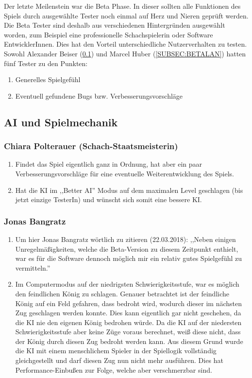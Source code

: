 \documentclass[12pt,a4paper]{article}
\begin{document}
{Der letzte Meilenstein war die Beta Phase. In dieser sollten alle Funktionen des Spiels durch ausgewählte Tester noch einmal auf Herz und Nieren geprüft werden. Die Beta Tester sind deshalb aus verschiedenen Hintergründen ausgewählt worden, zum Beispiel eine professionelle Schachspielerin oder Software EntwicklerInnen. Dies hat den Vorteil unterschiedliche Nutzerverhalten zu testen. \\[1ex]
Sowohl Alexander Beiser (\ref{SUBSEC:BETAGAME}) und Marcel Huber (\ref{SUBSEC:BETALAN}) hatten fünf Tester zu den Punkten:
\begin{enumerate}[I]
	\item{Generelles Spielgefühl}
	\item{Eventuell gefundene Bugs bzw. Verbesserungsvorschläge}
\end{enumerate}

\subsection{AI und Spielmechanik}
\label{SUBSEC:BETAGAME}


\subsubsection*{Chiara Polterauer (Schach-Staatsmeisterin)}
\begin{enumerate}[I]
	\item{Findet das Spiel eigentlich ganz in Ordnung, hat aber ein paar Verbesserungsvorschläge für eine eventuelle Weiterentwicklung des Spiels.}
	\item{Hat die KI im ,,Better AI'' Modus auf dem maximalen Level geschlagen (bis jetzt einzige TesterIn) und wünscht sich somit eine bessere KI. }
\end{enumerate}

\subsubsection*{Jonas Bangratz}
\begin{enumerate}[I]
	\item{Um hier Jonas Bangratz wörtlich zu zitieren (22.03.2018): ,,Neben einigen Unregelmäßigkeiten, welche die Beta-Version zu diesem Zeitpunkt enthielt, war es für die Software dennoch möglich mir ein relativ gutes Spielgefühl zu vermitteln.''}
	\item{Im Computermodus auf der niedrigsten Schwierigkeitsstufe, war es möglich den feindlichen König zu schlagen. Genauer betrachtet ist der feindliche König auf ein Feld gefahren, dass bedroht wird, wodurch dieser im nächsten Zug geschlagen werden konnte. Dies kann eigentlich gar nicht geschehen, da die KI nie den eigenen König bedrohen würde. Da die KI auf der niedersten Schwierigkeitsstufe aber keine Züge voraus berechnet, weiß diese nicht, dass der König durch diesen Zug bedroht werden kann. Aus diesem Grund wurde die KI mit einem menschlichem Spieler in der Spiellogik vollständig gleichgestellt und darf diesen Zug nun nicht mehr ausführen. Dies hat Performance-Einbußen zur Folge, welche aber verschmerzbar sind. }
\end{enumerate}

}
\end{document}

